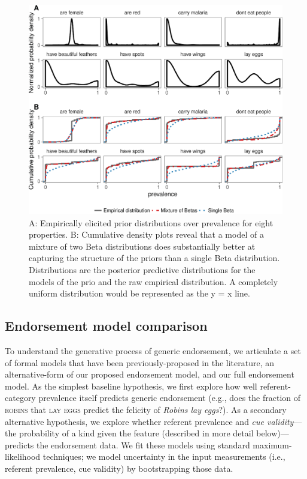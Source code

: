 \documentclass[english,floatsintext,man]{apa6}
\theoremstyle{definition}
\theoremstyle{definition}
\theoremstyle{definition}
\theoremstyle{remark}
\begin{document}
\begin{figure}[htbp]
\centering
\includegraphics{figs/generic-endorsement-priors-figure-1.pdf}
\caption{\label{fig:generic-endorsement-priors-figure}A: Empirically
elicited prior distributions over prevalence for eight properties. B:
Cumulative density plots reveal that a model of a mixture of two Beta
distributions does substantially better at capturing the structure of
the priors than a single Beta distribution. Distributions are the
posterior predictive distributions for the models of the prio and the
raw empirical distribution. A completely uniform distribution would be
represented as the y = x line.}
\end{figure}

\subsection{Endorsement model
comparison}\label{endorsement-model-comparison}

To understand the generative process of generic endorsement, we
articulate a set of formal models that have been previously-proposed in
the literature, an alternative-form of our proposed endorsement model,
and our full endorsement model. As the simplest baseline hypothesis, we
first explore how well referent-category prevalence itself predicts
generic endorsement (e.g., does the fraction of \textsc{robins} that
\textsc{lay eggs} predict the felicity of \emph{Robins lay eggs}?). As a
secondary alternative hypothesis, we explore whether referent prevalence
and \emph{cue validity}---the probability of a kind given the feature
(described in more detail below)---predicts the endorsement data. We fit
these models using standard maximum-likelihood techniques; we model
uncertainty in the input measurements (i.e., referent prevalence, cue
validity) by bootstrapping those data.
\end{document}

